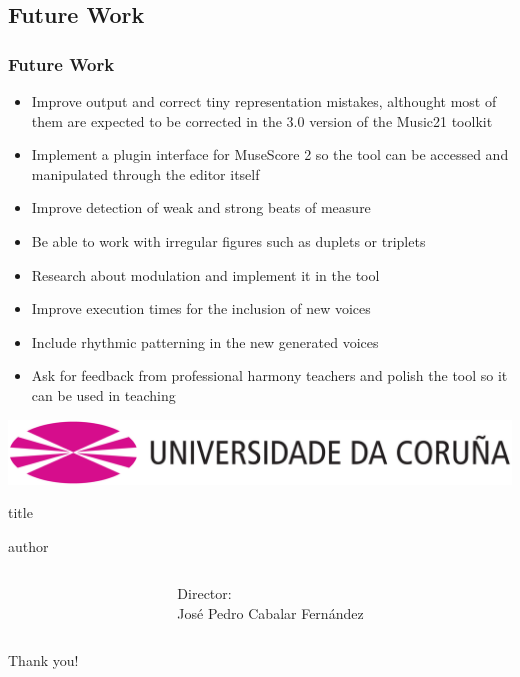 \documentclass[english]{beamer}
\newcommand{\director}{Director:\\José Pedro Cabalar Fernández}
\begin{document}
\subsection{Future Work}
	\begin{frame}
		\frametitle{Future Work}
		\begin{itemize}
			\item Improve output and correct tiny representation mistakes, althought most of them are expected to be corrected in the 3.0 version of the Music21 toolkit
			\item Implement a plugin interface for MuseScore 2 so the tool can be accessed and manipulated through the editor itself
			\item Improve detection of weak and strong beats of measure
			\item Be able to work with irregular figures such as duplets or triplets
			\item Research about modulation and implement it in the tool
			\item Improve execution times for the inclusion of new voices
			\item Include rhythmic patterning in the new generated voices
			\item Ask for feedback from professional harmony teachers and polish the tool so it can be used in teaching
		\end{itemize}
	\end{frame}
		
\begin{frame}
\centering
\vfill
\includegraphics[width=0.6\linewidth]{imagenes/anagramaUDC.png}
\vfill
\begin{beamercolorbox}[rounded=true,shadow=true,sep=8pt,center]{title}
\inserttitle \par
\end{beamercolorbox}
\vfill
\begin{beamercolorbox}[leftskip=8cm,center,wd=0.7\textwidth]{author}
\begin{columns}[T]
\begin{column}{.49\textwidth}%
\centering
\insertauthor
\end{column}
\begin{column}{.49\textwidth}%
\centering
\director
\end{column}
\end{columns}
\end{beamercolorbox}
\centering
\vfill
Thank you!
\vfill
\insertdate\par
\vfill
\end{frame}
\end{document}
